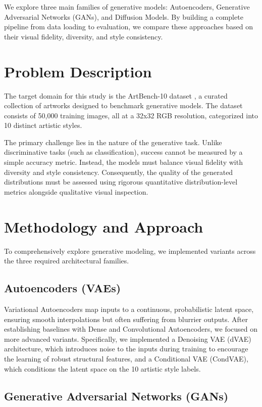 \documentclass[runningheads]{llncs}
\begin{document}
We explore three main families of generative models: Autoencoders, Generative Adversarial Networks (GANs), and Diffusion Models. By building a complete pipeline from data loading to evaluation, we compare these approaches based on their visual fidelity, diversity, and style consistency.

\section{Problem Description}
The target domain for this study is the ArtBench-10 dataset \cite{artbench2022}, a curated collection of artworks designed to benchmark generative models. The dataset consists of 50,000 training images, all at a 32x32 RGB resolution, categorized into 10 distinct artistic styles.

The primary challenge lies in the nature of the generative task. Unlike discriminative tasks (such as classification), success cannot be measured by a simple accuracy metric. Instead, the models must balance visual fidelity with diversity and style consistency. Consequently, the quality of the generated distributions must be assessed using rigorous quantitative distribution-level metrics alongside qualitative visual inspection.

\section{Methodology and Approach}
To comprehensively explore generative modeling, we implemented variants across the three required architectural families.

\subsection{Autoencoders (VAEs)}
Variational Autoencoders map inputs to a continuous, probabilistic latent space, ensuring smooth interpolations but often suffering from blurrier outputs. After establishing baselines with Dense and Convolutional Autoencoders, we focused on more advanced variants. Specifically, we implemented a Denoising VAE (dVAE) architecture, which introduces noise to the inputs during training to encourage the learning of robust structural features, and a Conditional VAE (CondVAE), which conditions the latent space on the 10 artistic style labels. 

\subsection{Generative Adversarial Networks (GANs)}
\end{document}
